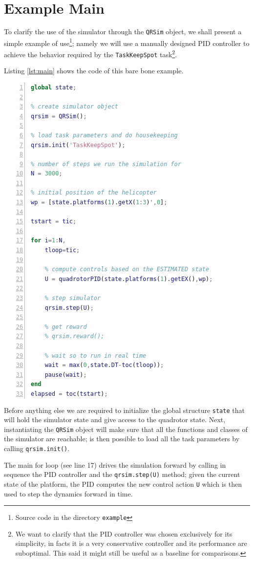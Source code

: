 \documentclass[a4paper,11pt]{report}
\newcommand{\snamettt}{\texttt{QRSim}\xspace}
\begin{document}
\section{Example Main}
To clarify the use of the simulator through the \snamettt object, we shall present a simple example of use\footnote{Source code in the directory \texttt{example}}; namely we will use a manually designed PID controller to achieve the behavior required by the \texttt{TaskKeepSpot} task\footnote{We want to clarify that the PID controller was chosen exclusively for its simplicity, in facts it is a very conservative controller and its performance are suboptimal. This said it might still be useful as a baseline for comparisons.}.

Listing \ref{lst:main} shows the code of this bare bone example. 

\begin{lstlisting}[float=ht!bp,caption=main script,language=Matlab,frame=lines,label=lst:main,numbers=left,basicstyle=\small]
global state;

% create simulator object
qrsim = QRSim();

% load task parameters and do housekeeping
qrsim.init('TaskKeepSpot');

% number of steps we run the simulation for
N = 3000;

% initial position of the helicopter
wp = [state.platforms(1).getX(1:3)',0];

tstart = tic;

for i=1:N,
    tloop=tic;

    % compute controls based on the ESTIMATED state 
    U = quadrotorPID(state.platforms(1).getEX(),wp);

    % step simulator
    qrsim.step(U);
    
    % get reward
    % qrsim.reward();
    
    % wait so to run in real time
    wait = max(0,state.DT-toc(tloop));
    pause(wait);
end
elapsed = toc(tstart);
\end{lstlisting}
Before anything else we are required to initialize the global structure \texttt{state} that will hold the simulator state and give access to the quadrotor state. Next, instantiating the \snamettt object will make sure that all the functions and classes of the simulator are reachable; is then possible to load all the task parameters by calling \texttt{qrsim.init()}. 

The main for loop (see line 17) drives the simulation forward by calling in sequence the PID controller and the \texttt{qrsim.step(U)} method; given the current state of the platform, the PID computes the new control action  \texttt{U} which is then used to step the dynamics forward in time.
\end{document}
